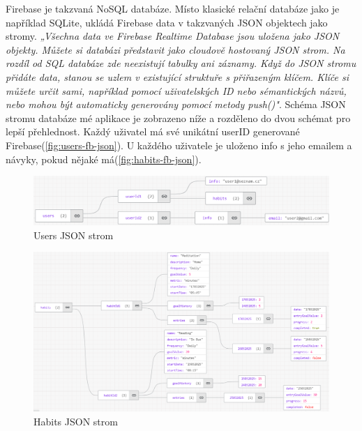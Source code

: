 \newpage
\setcounter{enumiv}{4}
Firebase je takzvaná NoSQL databáze. Místo klasické relační databáze jako je například SQLite, ukládá Firebase data v takzvaných JSON objektech jako stromy. \textit{„Všechna data ve Firebase Realtime Database jsou uložena jako JSON objekty. Můžete si databázi představit jako cloudově hostovaný JSON strom. Na rozdíl od SQL databáze zde neexistují tabulky ani záznamy. Když do JSON stromu přidáte data, stanou se uzlem v existující struktuře s přiřazeným klíčem. Klíče si můžete určit sami, například pomocí uživatelských ID nebo sémantických názvů, nebo mohou být automaticky generovány pomocí metody push()"}\cite{firebase2025}. Schéma JSON stromu databáze mé aplikace je zobrazeno níže a rozděleno do dvou schémat pro lepší přehlednost. Každý uživatel má své unikátní userID generované Firebase(\autoref{fig:users-fb-json}). U každého uživatele je uloženo info s jeho emailem a návyky, pokud nějaké má(\autoref{fig:habits-fb-json}).

\begin{figure}[H]
    \centering
    \includegraphics[width=1\linewidth]{images/userschema.png}
    \caption{Users JSON strom}
    \label{fig:users-fb-json}
\end{figure}

\begin{figure}[H]
    \centering
    \includegraphics[width=1\linewidth]{images/habitschema.png}
    \caption{Habits JSON strom}
    \label{fig:habits-fb-json}
\end{figure}
